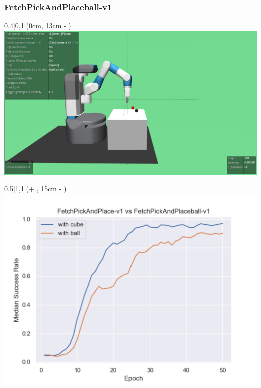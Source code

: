 




\begin{frame}
	\frametitle{FetchPickAndPlaceball-v1}	
	\vspace{1cm}
	
	\begin{textblock*}{0.4\paperwidth}[0,1](0cm, 13cm - \PraesentationSeitenrand)%
		\includegraphics[width=0.4\paperwidth]{./Ressourcen/Figures/FetchPickAndPlaceball-v1.pdf}
	\end{textblock*}
	
	\begin{textblock*}{0.5\paperwidth}[1,1](\textwidth + \PraesentationSeitenrand, 15cm - \PraesentationSeitenrand)%
		\includegraphics[width=0.5\paperwidth]{./Ressourcen/Figures/fig_FetchPickAndPlace-v1_vs_FetchPickAndPlaceball-v1.pdf}
	\end{textblock*}
	
	
\end{frame}
\clearpage


